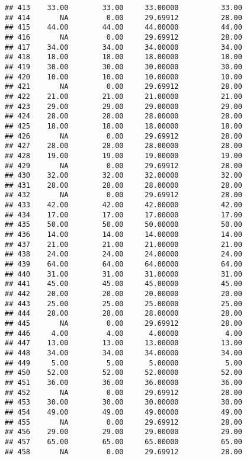 \documentclass[
]{article}
\begin{document}
\begin{verbatim}
## 413    33.00        33.00     33.00000          33.00
## 414       NA         0.00     29.69912          28.00
## 415    44.00        44.00     44.00000          44.00
## 416       NA         0.00     29.69912          28.00
## 417    34.00        34.00     34.00000          34.00
## 418    18.00        18.00     18.00000          18.00
## 419    30.00        30.00     30.00000          30.00
## 420    10.00        10.00     10.00000          10.00
## 421       NA         0.00     29.69912          28.00
## 422    21.00        21.00     21.00000          21.00
## 423    29.00        29.00     29.00000          29.00
## 424    28.00        28.00     28.00000          28.00
## 425    18.00        18.00     18.00000          18.00
## 426       NA         0.00     29.69912          28.00
## 427    28.00        28.00     28.00000          28.00
## 428    19.00        19.00     19.00000          19.00
## 429       NA         0.00     29.69912          28.00
## 430    32.00        32.00     32.00000          32.00
## 431    28.00        28.00     28.00000          28.00
## 432       NA         0.00     29.69912          28.00
## 433    42.00        42.00     42.00000          42.00
## 434    17.00        17.00     17.00000          17.00
## 435    50.00        50.00     50.00000          50.00
## 436    14.00        14.00     14.00000          14.00
## 437    21.00        21.00     21.00000          21.00
## 438    24.00        24.00     24.00000          24.00
## 439    64.00        64.00     64.00000          64.00
## 440    31.00        31.00     31.00000          31.00
## 441    45.00        45.00     45.00000          45.00
## 442    20.00        20.00     20.00000          20.00
## 443    25.00        25.00     25.00000          25.00
## 444    28.00        28.00     28.00000          28.00
## 445       NA         0.00     29.69912          28.00
## 446     4.00         4.00      4.00000           4.00
## 447    13.00        13.00     13.00000          13.00
## 448    34.00        34.00     34.00000          34.00
## 449     5.00         5.00      5.00000           5.00
## 450    52.00        52.00     52.00000          52.00
## 451    36.00        36.00     36.00000          36.00
## 452       NA         0.00     29.69912          28.00
## 453    30.00        30.00     30.00000          30.00
## 454    49.00        49.00     49.00000          49.00
## 455       NA         0.00     29.69912          28.00
## 456    29.00        29.00     29.00000          29.00
## 457    65.00        65.00     65.00000          65.00
## 458       NA         0.00     29.69912          28.00

\end{verbatim}
\end{document}
